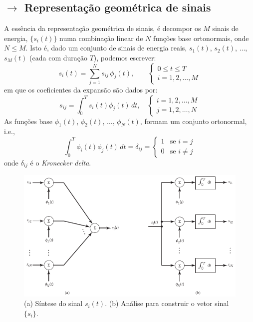 \subsection[4.1 Representação geométrica de sinais]{$\rightarrow$ Representação geométrica de sinais}
\label{subsec:geom-representation-of-signals}

A essência da representação geométrica de sinais, é decompor os $M$ sinais de energia, $\{s_i(t)\}$ numa combinação linear de $N$ funções base ortonormais, onde $N \leq M$. Isto é, dado um conjunto de sinais de energia reais, $s_1(t)$, $s_2(t)$, $\dots$, $s_M(t)$ (cada com duração $T$), podemos escrever:
$$
    s_{i}(t) = \sum_{j=1}^{N} s_{ij}\, \phi_j(t),\qquad
    \begin{cases}
        0 \leq t \leq T \\
        i = 1,2,\dots,M
    \end{cases}
$$
em que os coeficientes da expansão são dados por:
$$
    s_{ij} = \int_{0}^{T} s_i(t) \phi_j(t)\, dt,\quad
    \begin{cases}
        i = 1,2,\dots,M \\
        j = 1,2,\dots,N
    \end{cases}
$$
As funções base $\phi_1(t)$, $\phi_2(t)$, $\dots$, $\phi_N(t)$, formam um conjunto ortonormal, i.e.,
$$
    \int_{0}^{T} \phi_i(t) \phi_j(t)\, dt = \delta_{ij} =
    \begin{cases}
        1 & \text{se } i = j \\
        0 & \text{se } i \neq j
    \end{cases}
$$
onde $\delta_{ij}$ é o \textit{Kronecker delta}.

\begin{figure}[H]
    \centering
    \includegraphics[width = 0.7\linewidth]{img/digital/AWGN-transmission/signals-geom-decomposition.png}
    \caption{(a) Síntese do sinal $s_i(t)$. (b) Análise para construir o vetor sinal $\{s_i\}$.}
    \label{fig:signals-geom-decomposition}
\end{figure}

